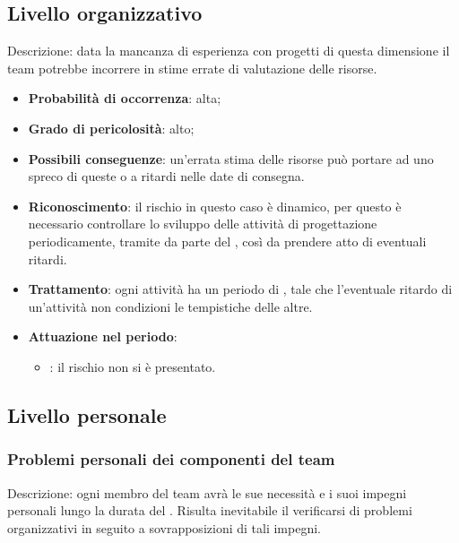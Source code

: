 \documentclass[PianoDiProgetto.tex]{subfiles}
\begin{document}
	\subsection{Livello organizzativo}
		\label{sec:lo}
Descrizione: data la mancanza di esperienza con progetti di questa dimensione il team potrebbe incorrere in stime errate di valutazione delle risorse.
	\begin{itemize}
		\item \textbf{Probabilità di occorrenza}: alta;
		\item \textbf{Grado di pericolosità}: alto;
		\item \textbf{Possibili conseguenze}: un'errata stima delle risorse può portare ad uno spreco di queste o a ritardi nelle date di consegna.
		\item \textbf{Riconoscimento}: il rischio in questo caso è dinamico, per questo è necessario controllare lo sviluppo delle attività di progettazione periodicamente, tramite   da parte del \RESP{}, così da prendere atto di eventuali ritardi.
		\item \textbf{Trattamento}: ogni attività ha un periodo di , tale che l'eventuale ritardo di un'attività non condizioni le tempistiche delle altre.
		\item \textbf{Attuazione nel periodo}: 
			\begin{itemize}
				\item \ARdoc : il rischio non si è presentato.
			\end{itemize}
	\end{itemize}
	
	\subsection{Livello personale}
		\subsubsection{Problemi personali dei componenti del team}
			\label{sec:ppdct}
Descrizione: ogni membro del team avrà le sue necessità e i suoi impegni personali lungo la durata del . Risulta inevitabile il verificarsi di problemi organizzativi in seguito a sovrapposizioni di tali impegni.
\end{document}
